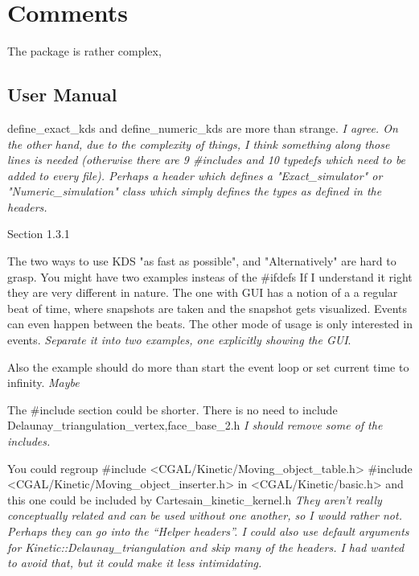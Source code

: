 \section{Comments}


The package is rather complex,


\subsection{User Manual}


define_exact_kds and define_numeric_kds are more than strange.
\textit{I agree. On the other hand, due to the complexity of things, I
think something along those lines is needed (otherwise there are 9
#includes and 10 typedefs which need to be added to every
file). Perhaps a header which defines a "Exact_simulator" or
"Numeric_simulation" class which simply defines the types as defined
in the headers.}






Section 1.3.1

The two ways to use KDS  "as fast as possible", and "Alternatively"
are hard to grasp. You might have two examples  insteas of the #ifdefs
If I understand it right they are very different in nature. The one
with GUI has a notion of a a regular beat of time, where snapshots
are taken and the snapshot gets visualized. Events can even happen
between the beats. The other mode of usage is only interested in
events.
\textit{Separate it into two examples, one explicitly showing the GUI}.


Also the example should do more than start the event loop  or
set current time to infinity.
\textit{Maybe}





The #include section could be shorter.
There is no need to include Delaunay_triangulation_{vertex,face}_base_2.h
\textit{I should remove some of the includes.}

You could regroup
#include <CGAL/Kinetic/Moving_object_table.h>
#include <CGAL/Kinetic/Moving_object_inserter.h>
in <CGAL/Kinetic/basic.h> and this one could
be included by Cartesain_kinetic_kernel.h
\textit{They aren't really conceptually related and can be used without one another, so I would rather not. Perhaps they can go into the ``Helper headers''. I could also use default arguments for Kinetic::Delaunay_triangulation and skip many of the headers. I had wanted to avoid that, but it could make it less intimidating.}


